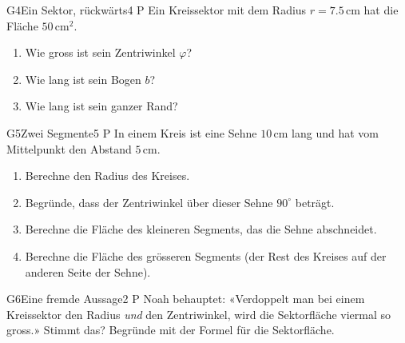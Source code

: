 \documentclass[11pt]{article}
\begin{document}
\begin{lpaufgabe}{G4}{Ein Sektor, rückwärts}{4 P}
Ein Kreissektor mit dem Radius $r = 7.5\,\text{cm}$ hat die Fläche $50\,\text{cm}^2$.
\begin{enumerate}[label=(\alph*),leftmargin=*,itemsep=2pt]
\item Wie gross ist sein Zentriwinkel $\varphi$?
\item Wie lang ist sein Bogen $b$?
\item Wie lang ist sein ganzer Rand?
\end{enumerate}
\end{lpaufgabe}

\begin{lpaufgabe}{G5}{Zwei Segmente}{5 P}
In einem Kreis ist eine Sehne $10\,\text{cm}$ lang und hat vom Mittelpunkt den Abstand $5\,\text{cm}$.
\begin{enumerate}[label=(\alph*),leftmargin=*,itemsep=2pt]
\item Berechne den Radius des Kreises.
\item Begründe, dass der Zentriwinkel über dieser Sehne $90^\circ$ beträgt.
\item Berechne die Fläche des kleineren Segments, das die Sehne abschneidet.
\item Berechne die Fläche des grösseren Segments (der Rest des Kreises auf der anderen Seite der Sehne).
\end{enumerate}
\end{lpaufgabe}

\begin{lpaufgabe}{G6}{Eine fremde Aussage}{2 P}
Noah behauptet: «Verdoppelt man bei einem Kreissektor den Radius \emph{und} den Zentriwinkel, wird die Sektorfläche viermal so
gross.» Stimmt das? Begründe mit der Formel für die Sektorfläche.
\end{lpaufgabe}
\end{document}
